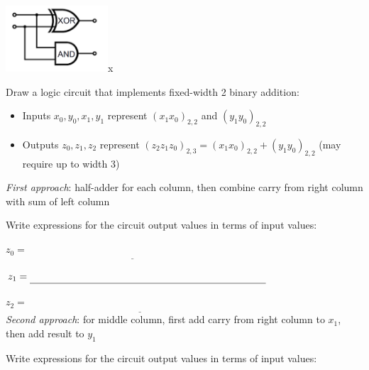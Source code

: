 \documentclass[12pt, oneside]{article}
\begin{document}
\begin{center}
\includegraphics[width=1.5in]{../Resources/images/half-adder.png}x
\end{center}

\newpage
Draw a logic circuit that implements fixed-width 2 binary addition:
\begin{itemize}
\item Inputs  $x_0, y_0, x_1, y_1$ represent $(x_1  x_0)_{2,2}$ and $(y_1 y_0)_{2,2}$
\item Outputs  $z_0, z_1, z_2$ represent $(z_2  z_1 z_0)_{2,3} = (x_1  x_0)_{2,2} + (y_1 y_0)_{2,2}$ (may require up to width  $3$)
\end{itemize}

{\it First approach}: half-adder for each column, then combine carry from right column with sum of left column

\vfill



Write expressions for the circuit output values in terms of input values:


$z_0 = \underline{\phantom{x_0 \oplus y_0\hspace{3in}}}$


$z_1 = \underline{\phantom{(x_1 \oplus y_1) \oplus c_0}\hspace{2.5in}}$ \phantom{where $c_0 = x_0 \land y_0$}


$z_2 = \underline{\phantom{(c_0 \land (x_1 \oplus y_1)) \oplus c_1}\hspace{2in}}$ \phantom{where $c_1 = x_1 \land y_1$}\\

{\it Second approach}: for middle column, first add carry from right column to $x_1$, then add result to $y_1$

\vfill


Write expressions for the circuit output values in terms of input values:

\end{document}
